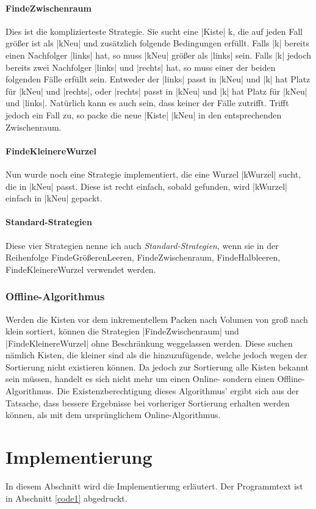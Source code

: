 \paragraph{FindeZwischenraum}
 Dies ist die komplizierteste Strategie. Sie sucht eine |Kiste| k, die auf jeden Fall größer ist als |kNeu| und zusätzlich folgende Bedingungen erfüllt.
 Falls |k| bereits einen Nachfolger |links| hat, so muss |kNeu| größer als |links| sein.
 Falls |k| jedoch bereits zwei Nachfolger |links| und |rechts| hat, so muss einer der beiden folgenden Fälle erfüllt sein.
  Entweder der |links|  passt in |kNeu| und |k| hat Platz für |kNeu| und |rechts|,
          oder |rechts| passt in |kNeu| und |k| hat Platz für |kNeu| und |links|.
 Natürlich kann es auch sein, dass keiner der Fälle zutrifft. Trifft jedoch ein Fall zu, so packe die neue |Kiste| |kNeu| in den entsprechenden Zwischenraum.
\paragraph{FindeKleinereWurzel}
 Nun wurde noch eine Strategie implementiert, die eine Wurzel |kWurzel| sucht, die in |kNeu| passt.
 Diese ist recht einfach, sobald gefunden, wird |kWurzel| einfach in |kNeu| gepackt.
\paragraph{Standard-Strategien}
 Diese vier Strategien nenne ich auch \emph{Standard-Strategien}, wenn sie in der Reihenfolge FindeGrößerenLeeren, FindeZwischenraum, FindeHalbleeren, FindeKleinereWurzel verwendet werden.
\subsubsection{Offline-Algorithmus}
 Werden die Kisten vor dem inkrementellem Packen nach Volumen von groß nach klein sortiert,
  können die Strategien |FindeZwischenraum| und |FindeKleinereWurzel| ohne Beschränkung weggelassen werden.
 Diese suchen nämlich Kisten, die kleiner sind als die hinzuzufügende, welche jedoch wegen der Sortierung nicht existieren können.
 Da jedoch zur Sortierung alle Kisten bekannt sein müssen, handelt es sich nicht mehr um einen Online- sondern einen Offline-Algorithmus.
 Die Existenzberechtigung dieses Algorithmus' ergibt sich aus der Tatsache, dass bessere Ergebnisse bei vorheriger Sortierung erhalten werden können,
  als mit dem ursprünglichem Online-Algorithmus.
\clearpage

\section{Implementierung}
\lstset{basicstyle=\ttfamily}
 In diesem Abschnitt wird die Implementierung erläutert. Der Programmtext ist in Abschnitt \ref{code1} abgedruckt.

